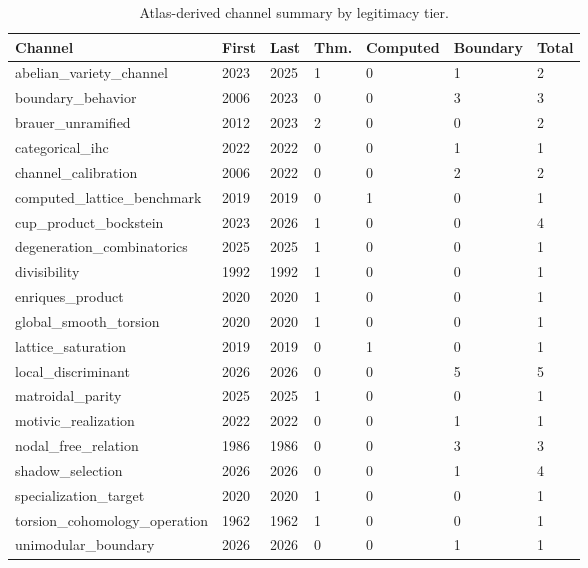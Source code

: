 \begin{table}[h]
\centering
\caption{Atlas-derived channel summary by legitimacy tier.}
\label{tab:channel-summary-analytics}
\footnotesize
\renewcommand{\arraystretch}{1.18}
\begin{tabular}{|p{}|p{}|p{}|p{}|p{}|p{}|p{}|}
\hline
Channel & First & Last & Thm. & Computed & Boundary & Total \\
\hline
abelian\_\allowbreak{}variety\_\allowbreak{}channel & 2023 & 2025 & 1 & 0 & 1 & 2 \\
boundary\_\allowbreak{}behavior & 2006 & 2023 & 0 & 0 & 3 & 3 \\
brauer\_\allowbreak{}unramified & 2012 & 2023 & 2 & 0 & 0 & 2 \\
categorical\_\allowbreak{}ihc & 2022 & 2022 & 0 & 0 & 1 & 1 \\
channel\_\allowbreak{}calibration & 2006 & 2022 & 0 & 0 & 2 & 2 \\
computed\_\allowbreak{}lattice\_\allowbreak{}benchmark & 2019 & 2019 & 0 & 1 & 0 & 1 \\
cup\_\allowbreak{}product\_\allowbreak{}bockstein & 2023 & 2026 & 1 & 0 & 0 & 4 \\
degeneration\_\allowbreak{}combinatorics & 2025 & 2025 & 1 & 0 & 0 & 1 \\
divisibility & 1992 & 1992 & 1 & 0 & 0 & 1 \\
enriques\_\allowbreak{}product & 2020 & 2020 & 1 & 0 & 0 & 1 \\
global\_\allowbreak{}smooth\_\allowbreak{}torsion & 2020 & 2020 & 1 & 0 & 0 & 1 \\
lattice\_\allowbreak{}saturation & 2019 & 2019 & 0 & 1 & 0 & 1 \\
local\_\allowbreak{}discriminant & 2026 & 2026 & 0 & 0 & 5 & 5 \\
matroidal\_\allowbreak{}parity & 2025 & 2025 & 1 & 0 & 0 & 1 \\
motivic\_\allowbreak{}realization & 2022 & 2022 & 0 & 0 & 1 & 1 \\
nodal\_\allowbreak{}free\_\allowbreak{}relation & 1986 & 1986 & 0 & 0 & 3 & 3 \\
shadow\_\allowbreak{}selection & 2026 & 2026 & 0 & 0 & 1 & 4 \\
specialization\_\allowbreak{}target & 2020 & 2020 & 1 & 0 & 0 & 1 \\
torsion\_\allowbreak{}cohomology\_\allowbreak{}operation & 1962 & 1962 & 1 & 0 & 0 & 1 \\
unimodular\_\allowbreak{}boundary & 2026 & 2026 & 0 & 0 & 1 & 1 \\
\hline
\end{tabular}
\end{table}

